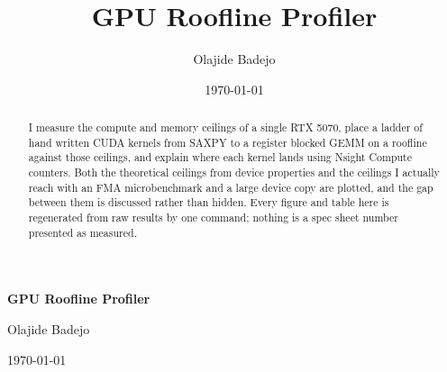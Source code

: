 \documentclass[11pt]{article}
\title{GPU Roofline Profiler}
\author{Olajide Badejo}
\date{\today}
\begin{document}
\begin{titlepage}
  \centering
  \vspace*{\fill}
  {\LARGE\bfseries GPU Roofline Profiler\par}
  \vspace*{\fill}
  {\large Olajide Badejo\par}
  \vspace{0.9em}
  {\large \today\par}
  \vspace{1.5cm}
\end{titlepage}

\begin{abstract}
I measure the compute and memory ceilings of a single RTX 5070, place a ladder
of hand written CUDA kernels from SAXPY to a register blocked GEMM on a roofline
against those ceilings, and explain where each kernel lands using Nsight Compute
counters. Both the theoretical ceilings from device properties and the ceilings
I actually reach with an FMA microbenchmark and a large device copy are plotted,
and the gap between them is discussed rather than hidden. Every figure and table
here is regenerated from raw results by one command; nothing is a spec sheet
number presented as measured.
\end{abstract}
\clearpage

\tableofcontents
\clearpage










\appendix




\end{document}
